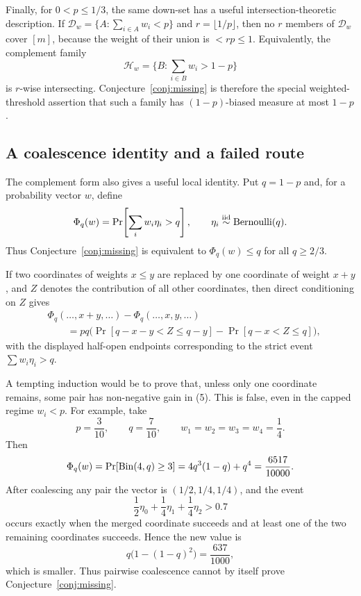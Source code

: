\documentclass[12pt]{article}
\newcommand{\Ber}{\operatorname{Bernoulli}}
\begin{document}
Finally, for \(0<p\le1/3\), the same down-set has a useful
intersection-theoretic description.  If
\(\mathcal D_w=\{A:\sum_{i\in A}w_i<p\}\) and
\(r=\lfloor1/p\rfloor\), then no \(r\) members of \(\mathcal D_w\) cover
\([m]\), because the weight of their union is \(<rp\le1\).  Equivalently, the
complement family
\[
   \mathcal H_w=\{B:\sum_{i\in B}w_i>1-p\}
\]
is \(r\)-wise intersecting.  Conjecture~\ref{conj:missing} is therefore the special
weighted-threshold assertion that such a family has \((1-p)\)-biased measure at
most \(1-p\).

\subsection*{A coalescence identity and a failed route}

The complement form also gives a useful local identity.  Put \(q=1-p\) and,
for a probability vector \(w\), define
\[
      \Phi_q(w)=\Pr\!\left[\sum_i w_i\eta_i>q\right],
      \qquad \eta_i\stackrel{\rm iid}{\sim}\Ber(q).
\]
Thus Conjecture~\ref{conj:missing} is equivalent to \(\Phi_q(w)\le q\) for all
\(q\ge2/3\).

If two coordinates of weights \(x\le y\) are replaced by one coordinate of
weight \(x+y\), and \(Z\) denotes the contribution of all other coordinates,
then direct conditioning on \(Z\) gives
\begin{equation}
\begin{aligned}
&\Phi_q(\ldots,x+y,\ldots)-\Phi_q(\ldots,x,y,\ldots)        \\
&\qquad
 =pq\Big(
       \Pr[q-x-y<Z\le q-y]
       -\Pr[q-x<Z\le q]
     \Big),
\end{aligned}                                      \tag{5}
\end{equation}
with the displayed half-open endpoints corresponding to the strict event
\(\sum w_i\eta_i>q\).

A tempting induction would be to prove that, unless only one coordinate remains,
some pair has non-negative gain in (5).  This is false, even in the capped regime
\(w_i<p\).  For example, take
\[
        p=\frac3{10},\qquad q=\frac7{10},\qquad
        w_1=w_2=w_3=w_4=\frac14 .
\]
Then
\[
   \Phi_q(w)=\Pr[{\rm Bin}(4,q)\ge3]
            =4q^3(1-q)+q^4=\frac{6517}{10000}.
\]
After coalescing any pair the vector is \((1/2,1/4,1/4)\), and the event
\[
        \frac12\eta_0+\frac14\eta_1+\frac14\eta_2>0.7
\]
occurs exactly when the merged coordinate succeeds and at least one of the two
remaining coordinates succeeds.  Hence the new value is
\[
        q\bigl(1-(1-q)^2\bigr)=\frac{637}{1000},
\]
which is smaller.  Thus pairwise coalescence cannot by itself prove
Conjecture~\ref{conj:missing}.
\end{document}
